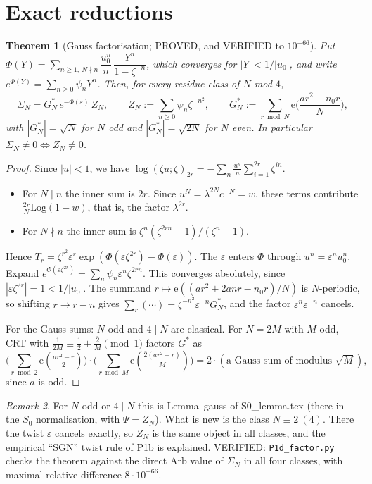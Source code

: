 \documentclass[11pt]{article}
\newtheorem{theorem}{Theorem}\newtheorem{lemma}[theorem]{Lemma}\newtheorem{proposition}[theorem]{Proposition}
\theoremstyle{definition}\newtheorem{definition}[theorem]{Definition}
\theoremstyle{remark}\newtheorem{remark}[theorem]{Remark}
\newcommand{\e}{\mathrm{e}}
\begin{document}
\section{Exact reductions}
\begin{theorem}[Gauss factorisation; PROVED, and VERIFIED to $10^{-66}$]\label{thm:gauss}
Put $\Phi(Y)=\sum_{n\ge1,\ N\nmid n}\dfrac{u_0^n}{n}\,\dfrac{Y^n}{1-\zeta^{-n}}$, which converges for $|Y|<1/|u_0|$, and write $e^{\Phi(Y)}=\sum_{n\ge0}\psi_nY^n$. Then, for every residue class of $N$ mod $4$,
\[\Sigma_N=G^*_N\,e^{-\Phi(\varepsilon)}\,Z_N,\qquad Z_N:=\sum_{n\ge0}\psi_n\zeta^{-n^2},\qquad G^*_N:=\sum_{r\bmod N}\e\Big(\frac{ar^2-n_0r}{N}\Big),\]
with $|G^*_N|=\sqrt N$ for $N$ odd and $|G_N^*|=\sqrt{2N}$ for $N$ even. In particular $\Sigma_N\ne0\iff Z_N\ne0$.
\end{theorem}
\begin{proof}
Since $|u|<1$, we have $\log(\zeta u;\zeta)_{2r}=-\sum_n\frac{u^n}{n}\sum_{i=1}^{2r}\zeta^{in}$.
\begin{itemize}
\item For $N\mid n$ the inner sum is $2r$. Since $u^N=\lambda^{2N}c^{-N}=w$, these terms contribute $\frac{2r}N\mathrm{Log}(1-w)$, that is, the factor $\lambda^{2r}$.
\item For $N\nmid n$ the inner sum is $\zeta^n(\zeta^{2rn}-1)/(\zeta^n-1)$.
\end{itemize}
Hence $T_r=\zeta^{r^2}\varepsilon^r\exp(\Phi(\varepsilon\zeta^{2r})-\Phi(\varepsilon))$. The $\varepsilon$ enters $\Phi$ through $u^n=\varepsilon^nu_0^n$.
Expand $e^{\Phi(\varepsilon\zeta^{2r})}=\sum_n\psi_n\varepsilon^n\zeta^{2rn}$. This converges absolutely, since $|\varepsilon\zeta^{2r}|=1<1/|u_0|$.
The summand $r\mapsto\e((ar^2+2anr-n_0r)/N)$ is $N$-periodic, so shifting $r\to r-n$ gives $\sum_r(\cdots)=\zeta^{-n^2}\varepsilon^{-n}G^*_N$, and the factor $\varepsilon^{n}\varepsilon^{-n}$ cancels.

For the Gauss sums: $N$ odd and $4\mid N$ are classical. For $N=2M$ with $M$ odd, CRT with $\frac1{2M}\equiv\frac{1}{2}+\frac{\bar2}{M}\pmod 1$ factors $G^*$ as
\[\Big(\sum_{r\bmod 2}\e(\tfrac{ar^2-r}{2})\Big)\cdot\Big(\sum_{r\bmod M}\e(\tfrac{\bar2(ar^2-r)}{M})\Big)=2\cdot(\text{a Gauss sum of modulus }\sqrt M),\]
since $a$ is odd.
\end{proof}

\begin{remark}
For $N$ odd or $4\mid N$ this is Lemma~gauss of S0\_lemma.tex (there in the $S_0$ normalisation, with $\Psi=Z_N$). What is new is the class $N\equiv2\ (4)$. There the twist $\varepsilon$ cancels exactly, so $Z_N$ is the same object in all classes, and the empirical ``SGN'' twist rule of P1b is explained.
VERIFIED: \texttt{P1d\_factor.py} checks the theorem against the direct Arb value of $\Sigma_N$ in all four classes, with maximal relative difference $8\cdot10^{-66}$.
\end{remark}
\end{document}
